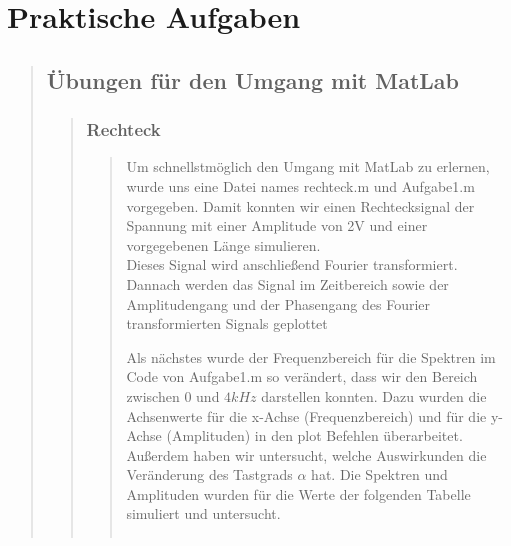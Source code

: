 \section{Praktische Aufgaben}

    \begin{quote}
        \subsection{Übungen für den Umgang mit MatLab}
		\begin{quote}
    		\subsubsection{Rechteck}
            \begin{quote}
                Um schnellstmöglich den Umgang mit MatLab zu erlernen, wurde uns eine Datei
                names rechteck.m und Aufgabe1.m vorgegeben. Damit konnten wir einen
                Rechtecksignal der Spannung mit einer Amplitude von 2V und einer
                vorgegebenen Länge simulieren.\\
                Dieses Signal wird anschließend Fourier transformiert. Dannach werden das Signal im Zeitbereich sowie der
                Amplitudengang und der Phasengang des Fourier transformierten Signals geplottet 
                
                \vspace{1em}
                
                Als nächstes wurde der Frequenzbereich für die
                Spektren im Code von Aufgabe1.m so verändert, dass wir den Bereich zwischen $0$
                und $4kHz$ darstellen konnten. Dazu wurden die Achsenwerte für die x-Achse
                (Frequenzbereich) und für die y-Achse (Amplituden) in den plot Befehlen
                überarbeitet.\\
                Außerdem haben wir untersucht, welche Auswirkunden die Veränderung des
                Tastgrads $\alpha$ hat. Die Spektren und Amplituden wurden für die Werte der
                folgenden Tabelle simuliert und untersucht.
                
                \vspace{1em}
                
                    \begin{center}
                         \begin{tabular}{|c|c|c|c|}
                             

\end{tabular}
\end{center}
\end{quote}
\end{quote}
\end{quote}
